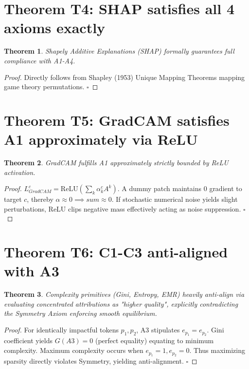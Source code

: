 \documentclass{article}
\newtheorem{theorem}{Theorem}
\begin{document}
\section*{Theorem T4: SHAP satisfies all 4 axioms exactly}
\begin{theorem}
Shapely Additive Explanations (SHAP) formally guarantees full compliance with A1-A4.
\end{theorem}
\begin{proof}
Directly follows from Shapley (1953) Unique Mapping Theorems mapping game theory permutations. $\square$
\end{proof}

\section*{Theorem T5: GradCAM satisfies A1 approximately via ReLU}
\begin{theorem}
GradCAM fulfills A1 approximately strictly bounded by ReLU activation.
\end{theorem}
\begin{proof}
$L_{GradCAM}^c = \text{ReLU}(\sum_k \alpha_k^c A^k)$. A dummy patch maintains 0 gradient to target $c$, thereby $\alpha \approx 0 \implies sum \approx 0$. If stochastic numerical noise yields slight perturbations, ReLU clips negative mass effectively acting as noise suppression. $\square$
\end{proof}

\section*{Theorem T6: C1-C3 anti-aligned with A3}
\begin{theorem}
Complexity primitives (Gini, Entropy, EMR) heavily anti-align via evaluating concentrated attributions as "higher quality", explicitly contradicting the Symmetry Axiom enforcing smooth equilibrium.
\end{theorem}
\begin{proof}
For identically impactful tokens $p_1, p_2$, A3 stipulates $e_{p_1} = e_{p_2}$. Gini coefficient yields $G(A3) = 0$ (perfect equality) equating to minimum complexity. Maximum complexity occurs when $e_{p_1}=1, e_{p_2}=0$. Thus maximizing sparsity directly violates Symmetry, yielding anti-alignment. $\square$
\end{proof}
\end{document}

